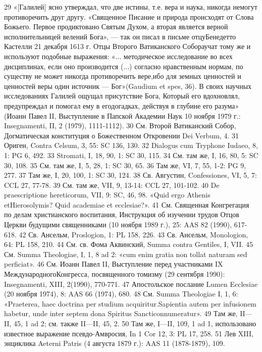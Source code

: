 \documentclass[a5paper,10pt]{article}
\begin{document}
29 «[Галилей] ясно утверждал, что две истины, т.е. вера и наука, никогда немогут противоречить друг другу. «Священное Писание и природа происходят от Слова Божьего. Первое продиктовано Святым Духом, а вторая является верной исполнительницей велений Бога», — так он писал в письме отцуБенедетто Кастелли 21 декабря 1613 г. Отцы Второго Ватиканского Собораучат тому же и используют подобные выражения: «... методическое исследование во всех дисциплинах, если оно производится (...) согласно нравственным нормам, по существу не может никогда противоречить вере,ибо для земных ценностей и ценностей веры один источник — Бог»(Gaudium et spes, 36). В своих научных исследованиях Галилей ощущал присутствие Бога, Который его вдохновлял, предупреждал и помогал ему в егодогадках, действуя в глубине его разума» (Иоанн Павел II, Выступление в Папской Академии Наук 10 ноября 1979 г.: Insegnamenti, II, 2 (1979), 1111-1112).
30 См. Второй Ватиканский Собор, Догматическая конституция о Божественном Откровении Dei Verbum, 4.
31 Ориген, Contra Celsum, 3, 55: SC 136, 130.
32 Dialogus cum Tryphone Iudaeo, 8, 1: PG 6, 492.
33 Stromati, I, 18, 90, 1: SC 30, 115.
34 См. там же, I, 16, 80, 5: SC 30, 108.
35 См. там же, I, 5, 28, 1: SC 30, 65.
36 Там же, VI, 7, 55, 1-2: PG 9, 277.
37 Там же, I, 20, 100, 1: SC 30, 124.
38 Св. Августин, Confessiones, VI, 5, 7: CCL 27, 77-78.
39 См. там же, VII, 9, 13-14: CCL 27, 101-102.
40 De praescriptione hereticorum, VII, 9: SC, 46, 98. «Quid ergo Athenis etHierosolymis? Quid academiae et ecclesiae?».
41 См. Священная Конгрегация по делам христианского воспитания, Инструкция об изучении трудов Отцов Церкви будущими священниками (10 ноября 1989 г.), 25: AAS 82 (1990), 617-618.
42 Св. Ансельм, Proslogion, 1: PL 158, 226.
43 Св. Ансельм, Monologion, 64: PL 158, 210.
44 См. св. Фома Аквинский, Summa contra Gentiles, I, VII.
45 См. Summa Theologiae, I, 1, 8 ad 2: «cum enim gratia non tollat naturam sed perficiat».
46 См. Иоанн Павел II, Выступление перед участниками IX МеждународногоКонгресса, посвященного томизму (29 сентября 1990): Insegnamenti, XIII, 2(1990), 770-771.
47 Апостольское послание Lumen Ecclesiae (20 ноября 1974), 8: AAS 66 (1974), 680.
48 См. Summa Theologiae I, 1, 6: «Praeterea, haec doctrina per studium acquiritur.Sapientia autem per infusionem habetur, unde inter septem dona Spiritus Sancticonnumeratur».
49 Там же, II—II, 45, 1 ad 2; см. также II—II, 45, 2.
50 Там же, I—II, 109, 1 ad 1, использовано известное выражение псевдо-Амвросия, In 1 Cor 12, 3: PL 17, 258.
51 Лев XIII, энциклика Aeterni Patris (4 августа 1879 г.): AAS 11 (1878-1879), 109.
\end{document}
